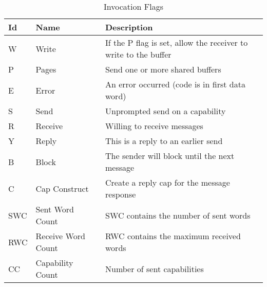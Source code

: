 \begin{table}[ht]
\begin{tabular}{l l l}
\hline\hline
Id & Name & Description \\
\hline
W & Write & If the P flag is set, allow the receiver to write to the buffer \\
P & Pages & Send one or more shared buffers \\
E & Error & An error occurred (code is in first data word) \\
S & Send & Unprompted send on a capability \\
R & Receive & Willing to receive messages \\
Y & Reply & This is a reply to an earlier send \\
B & Block & The sender will block until the next message \\
C & Cap Construct & Create a reply cap for the message response \\
SWC & Sent Word Count & SWC contains the number of sent words \\
RWC & Receive Word Count & RWC contains the maximum received words \\
CC & Capability Count & Number of sent capabilities \\
\end{tabular}
\caption{Invocation Flags}
\label{table:invocation_flags}
\end{table}

